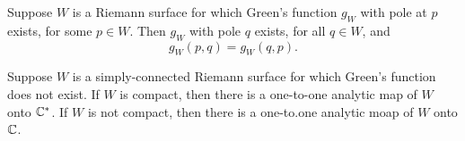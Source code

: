 \documentclass[12pt]{article}
\begin{document}
\begin{theorem}
    Suppose $W$ is a Riemann surface for which Green's function $g_W$ with pole at $p$ exists, for some $p\in W$. Then $g_W$ with pole $q$ exists, for all $q\in W$, and 
    \begin{equation*}
        g_W(p,q)=g_W(q,p).
    \end{equation*}
\end{theorem}

\begin{theorem}
    Suppose $W$ is a simply-connected Riemann surface for which Green's function does not exist. If $W$ is compact, then there is a one-to-one analytic map of $W$ onto $\mathbb{C}^*$. If $W$ is not compact, then there is a one-to.one analytic moap of $W$ onto $\mathbb{C}$.
\end{theorem}
\end{document}

